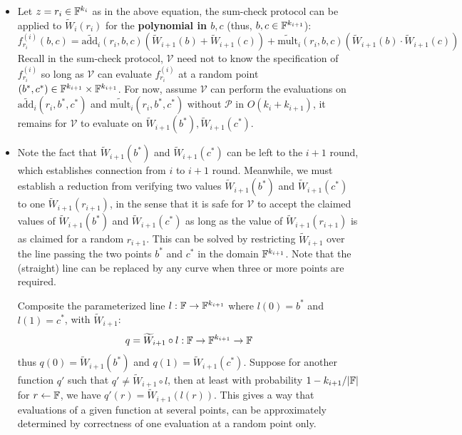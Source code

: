 \documentclass{article}
\begin{document}
\begin{itemize}
\item Let $z = r_i \in \mathbb{F}^{k_i}$ as in the above equation, the sum-check protocol can be applied to $\widetilde{W}_i(r_i)$ for the \textbf{polynomial in $b, c$} (thus, $b, c \in \mathbb{F}^{k_{i+1}}$):
\begin{equation*}
f_{r_i}^{(i)}(b, c) =  \widetilde{\text{add}_i}(r_i, b, c)(\widetilde{W}_{i+1}(b) + \widetilde{W}_{i+1}(c)) + \widetilde{\text{mult}}_i(r_{i}, b, c)(\widetilde{W}_{i+1}(b) \cdot \widetilde{W}_{i + 1}(c))
\end{equation*}
Recall in the sum-check protocol, $\mathcal{V}$ need not to know the specification of $f_{r_i}^{(i)}$ so long as $\mathcal{V}$ can evaluate $f_{r_i}^{(i)}$ at a random point $(b^{*}, c^{*}) \in \mathbb{F}^{k_{i+1}} \times \mathbb{F}^{k_{i+1}}$. For now, assume $\mathcal{V}$ can perform the evaluations on $\widetilde{\text{add}_i}(r_i, b^{*}, c^{*})$ and $\widetilde{\text{mult}}_i(r_{i}, b^{*}, c^{*})$ without $\mathcal{P}$ in $O(k_i + k_{i+1})$, it remains for $\mathcal{V}$ to evaluate on $\widetilde{W}_{i+1}(b^{*}), \widetilde{W}_{i+1}(c^{*})$. 
\item Note the fact that $\widetilde{W}_{i+1}(b^{*})$ and $\widetilde{W}_{i+1}(c^{*})$ can be left to the $i+1$ round, which establishes connection from $i$ to $i+1$ round. Meanwhile, we must establish a reduction from verifying two values $\widetilde{W}_{i+1}(b^{*})$ and $\widetilde{W}_{i+1}(c^{*})$ to one $\widetilde{W}_{i+1}(r_{i+1})$, in the sense that  it is safe for $\mathcal{V}$ to accept the claimed values of $\widetilde{W}_{i+1}(b^{*})$ and  $\widetilde{W}_{i+1}(c^{*})$ as long as the value of $\widetilde{W}_{i+1}(r_{i+1})$ is as claimed for a random $r_{i+1}$.  This can be solved by restricting $\widetilde{W}_{i+1}$ over the line passing the two points $b^{*}$ and $c^{*}$ in the domain $\mathbb{F}^{k_{i+1}}$. Note that the (straight) line can be replaced by any curve when three or more points are required. 
\begin{lemma} \label{lem:line-point}
Composite the parameterized line $l: \mathbb{F} \rightarrow \mathbb{F}^{k_{i+1}}$ where $l(0) = b^{*}$ and $l(1) = c^{*}$, with $\widetilde{W}_{i+1}$:
\begin{equation*}
q = \widetilde{W}_{i+1} \circ l: \mathbb{F} \rightarrow  \mathbb{F}^{k_{i+1}} \rightarrow \mathbb{F}
\end{equation*}
thus $q(0) = \widetilde{W}_{i+1}(b^{*})$ and $q(1) = \widetilde{W}_{i+1}(c^{*})$. Suppose for another function $q'$ such that $q' \neq \widetilde{W}_{i+1} \circ l$, then at least with probability $1 - k_{i+1}/|\mathbb{F}|$ for $r \leftarrow \mathbb{F}$, we have $q'(r) = \widetilde{W}_{i+1}(l(r))$. This gives a way that evaluations of a given function at several points, can be approximately determined by correctness of one evaluation at a random point only.

\end{lemma}
\end{itemize}
\end{document}
